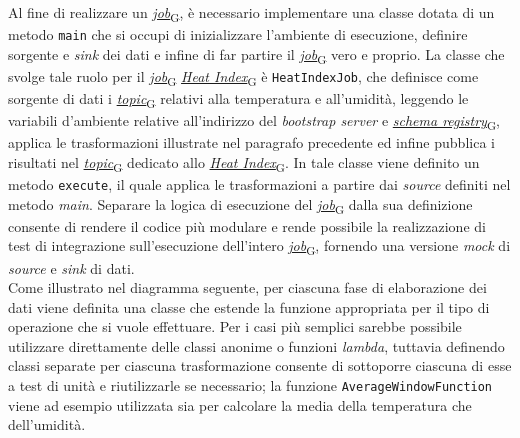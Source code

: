 Al fine di realizzare un \href{https://7last.github.io/docs/pb/documentazione-interna/glossario\#job}{\textit{job}\textsubscript{G}}, è necessario implementare una classe dotata di un metodo \texttt{main} che si occupi di inizializzare l'ambiente di esecuzione, definire
sorgente e \textit{sink} dei dati e infine di far partire il \href{https://7last.github.io/docs/pb/documentazione-interna/glossario\#job}{\textit{job}\textsubscript{G}} vero e proprio.
La classe che svolge tale ruolo per il \href{https://7last.github.io/docs/pb/documentazione-interna/glossario\#job}{\textit{job}\textsubscript{G}} \href{https://7last.github.io/docs/pb/documentazione-interna/glossario\#heat-index}{\textit{Heat Index}\textsubscript{G}} è \texttt{HeatIndexJob}, che definisce come sorgente di dati
i \href{https://7last.github.io/docs/pb/documentazione-interna/glossario\#topic}{\textit{topic}\textsubscript{G}} relativi alla temperatura e all'umidità, leggendo le variabili d'ambiente relative all'indirizzo del \textit{bootstrap server} e \href{https://7last.github.io/docs/pb/documentazione-interna/glossario\#schema-registry}{\textit{schema registry}\textsubscript{G}},
applica le trasformazioni illustrate nel paragrafo precedente ed infine pubblica i risultati nel \href{https://7last.github.io/docs/pb/documentazione-interna/glossario\#topic}{\textit{topic}\textsubscript{G}} dedicato allo \href{https://7last.github.io/docs/pb/documentazione-interna/glossario\#heat-index}{\textit{Heat Index}\textsubscript{G}}.
In tale classe viene definito un metodo \texttt{execute}, il quale applica le trasformazioni a partire dai \textit{source} definiti nel metodo \textit{main}. Separare
la logica di esecuzione del \href{https://7last.github.io/docs/pb/documentazione-interna/glossario\#job}{\textit{job}\textsubscript{G}} dalla sua definizione consente di rendere il codice più modulare e rende possibile la realizzazione di test di integrazione sull'esecuzione
dell'intero \href{https://7last.github.io/docs/pb/documentazione-interna/glossario\#job}{\textit{job}\textsubscript{G}}, fornendo una versione \textit{mock} di \textit{source} e \textit{sink} di dati.\\
Come illustrato nel diagramma seguente, per ciascuna fase di elaborazione dei dati viene definita una classe che estende la funzione appropriata per il tipo di operazione che si
vuole effettuare. Per i casi più semplici sarebbe possibile utilizzare direttamente delle classi anonime o funzioni \textit{lambda}, tuttavia definendo classi separate
per ciascuna trasformazione consente di sottoporre ciascuna di esse a test di unità e riutilizzarle se necessario; la funzione \texttt{AverageWindowFunction} viene ad esempio
utilizzata sia per calcolare la media della temperatura che dell'umidità.

